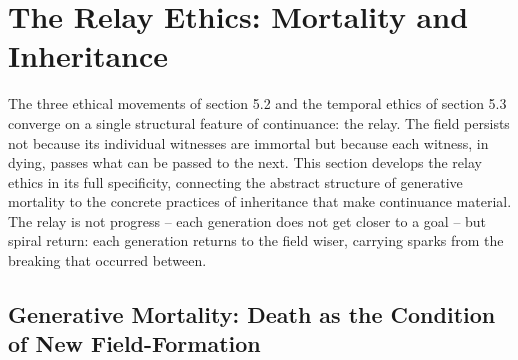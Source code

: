 \section{The Relay Ethics: Mortality and Inheritance}

The three ethical movements of section 5.2 and the temporal ethics of section 5.3 converge on a single structural feature of continuance: the relay. The field persists not because its individual witnesses are immortal but because each witness, in dying, passes what can be passed to the next. This section develops the relay ethics in its full specificity, connecting the abstract structure of generative mortality to the concrete practices of inheritance that make continuance material. The relay is not progress – each generation does not get closer to a goal – but spiral return: each generation returns to the field wiser, carrying sparks from the breaking that occurred between.

\subsection{Generative Mortality: Death as the Condition of New Field-Formation}

